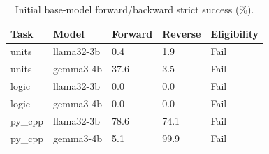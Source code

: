 \begin{table}[t]
\centering\small
\begin{tabular}{lllll}
\toprule
Task & Model & Forward & Reverse & Eligibility \\
\midrule
units & llama32-3b & 0.4 & 1.9 & Fail \\
units & gemma3-4b & 37.6 & 3.5 & Fail \\
logic & llama32-3b & 0.0 & 0.0 & Fail \\
logic & gemma3-4b & 0.0 & 0.0 & Fail \\
py\_cpp & llama32-3b & 78.6 & 74.1 & Fail \\
py\_cpp & gemma3-4b & 5.1 & 99.9 & Fail \\
\bottomrule
\end{tabular}
\caption{Initial base-model forward/backward strict success (\%).}
\label{tab:domain-gates-snapshot}
\end{table}
